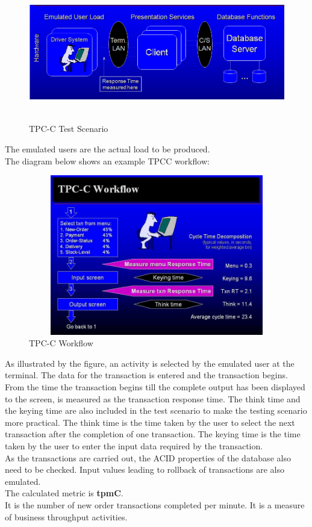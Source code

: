 \documentclass[12pt]{book}
\begin{document}
  \begin{figure}[H]
   \centering
   \includegraphics[width=14cm, height=6cm]{images/tpcc_intro3}
   \caption{TPC-C Test Scenario\label{fig:fig13_JMeter}}
  \end{figure}
  
The emulated users are the actual load to be produced. \\
The diagram below shows an example TPCC workflow:
  \begin{figure}[H]
   \centering
   \includegraphics[width=14cm, height=7cm]{images/tpcc_intro4}
   \caption{TPC-C Workflow\label{fig:fig14_JMeter}}
  \end{figure}

  As illustrated by the figure, an activity is selected by the emulated user at the terminal.
  The data for the transaction is entered and the transaction begins.
  From the time the transaction begins till the complete output has been displayed to the screen, is measured as the transaction response time.
  The think time and the keying time are also included in the test scenario to make the testing scenario more practical.
  The think time is the time taken by the user to select the next transaction after the completion of one transaction.
  The keying time is the time taken by the user to enter the input data required by the transaction.\\
  As the transactions are carried out, the ACID properties of the database also need to be checked.
  Input values leading to rollback of transactions are also emulated.\\
  The calculated metric is \textbf{tpmC}.\\
  It is the number of new order transactions completed per minute. It is a measure of business throughput activities. \\
\end{document}
